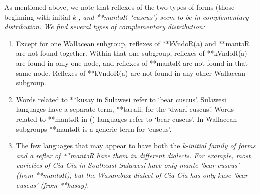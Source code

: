 As mentioned above, we note that reflexes of the two types of
forms (those beginning with initial \it{k-},
and **mantəR ‘cuscus’) seem to be in complementary distribution.
We find several types of complementary distribution:

\begin{enumerate}
	\item	Except for one Wallacean subgroup,
				reflexes of **kVndoR(a) and **mantəR are not found together.
				Within that one subgroup,
				reflexes of **kVndoR(a) are found in only one node,
				and reflexes of **mantəR are not found in that same node.
				Reflexes of **kVndoR(a) are not found in any other Wallacean subgroup.
	\item	Words related to **kusay in Sulawesi refer to ‘bear cuscus’.
				Sulawesi languages have a separate term,
				**taŋali, for the ‘dwarf cuscus’.
				Words related to **mantəR in  () languages
				refer to ‘bear cuscus’.
				In Wallacean subgroups **mantəR is a generic term for ‘cuscus’.
	\item	The few languages that may appear to have both the \it{k}-initial
				family of forms and a reflex of **mantəR have them in different dialects.
				For example, most varieties of Cia-Cia in Southeast Sulawesi
				have only \it{mante} ‘bear cuscus’ (from **mantəR),
				but the Wasambua dialect of Cia-Cia has only \it{kuse} ‘bear cuscus’ (from **kusay).
\end{enumerate}
